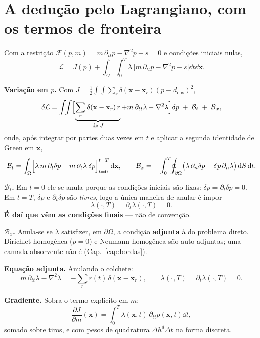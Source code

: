 \documentclass[11pt,a4paper,oneside]{report}
\begin{document}
\section{A dedu\c{c}\~ao pelo Lagrangiano, com os termos de fronteira}

\begin{derivacao}
Com a restri\c{c}\~ao $\mathcal{F}(p,m) = m\,\partial_{tt}p - \nabla^{2}p - s
= 0$ e condi\c{c}\~oes iniciais nulas,
\[
\mathcal{L} = J(p) + \int_{\Omega}\!\!\int_{0}^{T}
\lambda\,\bigl[m\,\partial_{tt}p - \nabla^{2}p - s\bigr]\dd t\dd\mathbf{x}.
\]

\textbf{Varia\c{c}\~ao em $p$.} Com
$J = \tfrac12\int\!\!\int\sum_r\delta(\mathbf{x}-\mathbf{x}_r)(p-d_{\text{obs}})^{2}$,
\[
\delta\mathcal{L}
 = \int\!\!\int\Bigl[\underbrace{\sum_r\delta(\mathbf{x}-\mathbf{x}_r)\,r}_{\text{de }J}
 + m\,\partial_{tt}\lambda - \nabla^{2}\lambda\Bigr]\delta p
 \;+\; \mathcal{B}_t \;+\; \mathcal{B}_x ,
\]
onde, ap\'os integrar por partes duas vezes em $t$ e aplicar a segunda
identidade de Green em $\mathbf{x}$,
\[
\mathcal{B}_t = \int_\Omega \Bigl[\lambda\,m\,\partial_t\delta p
 - m\,\partial_t\lambda\,\delta p\Bigr]_{t=0}^{t=T}\,\mathrm{d}\mathbf{x},
\qquad
\mathcal{B}_x = -\int_0^T\!\!\oint_{\partial\Omega}
 \bigl(\lambda\,\partial_n\delta p - \delta p\,\partial_n\lambda\bigr)\,\mathrm{d} S\,\mathrm{d} t .
\]

\textbf{$\mathcal{B}_t$.} Em $t=0$ ele se anula porque as condi\c{c}\~oes
iniciais s\~ao fixas: $\delta p = \partial_t\delta p = 0$. Em $t=T$,
$\delta p$ e $\partial_t\delta p$ s\~ao \emph{livres}, logo a \'unica maneira
de anular \'e impor
\[
\lambda(\cdot,T) = \partial_t\lambda(\cdot,T) = 0 .
\]
\textbf{\'E da\'i que v\^em as condi\c{c}\~oes finais} --- n\~ao de
conven\c{c}\~ao.

\textbf{$\mathcal{B}_x$.} Anula-se se $\lambda$ satisfizer, em
$\partial\Omega$, a condi\c{c}\~ao \textbf{adjunta} \`a do problema direto.
Dirichlet homog\^enea ($p=0$) e Neumann homog\^enea s\~ao auto-adjuntas; uma
camada absorvente n\~ao \'e (Cap.~\ref{cap:bordas}).

\textbf{Equa\c{c}\~ao adjunta.} Anulando o colchete:
\begin{equation}
m\,\partial_{tt}\lambda - \nabla^{2}\lambda
 = -\sum_r r(t)\,\delta(\mathbf{x}-\mathbf{x}_r),
\qquad
\lambda(\cdot,T) = \partial_t\lambda(\cdot,T) = 0 .
\label{eq:adjunta3}
\end{equation}

\textbf{Gradiente.} Sobra o termo expl\'icito em $m$:
\begin{equation}
\frac{\partial J}{\partial m}(\mathbf{x})
 = \int_{0}^{T}\lambda(\mathbf{x},t)\,\partial_{tt}p(\mathbf{x},t)\dd t ,
\label{eq:grad3}
\end{equation}
somado sobre tiros, e com pesos de quadratura $\Delta h^{d}\Delta t$ na forma
discreta.
\end{derivacao}
\end{document}
